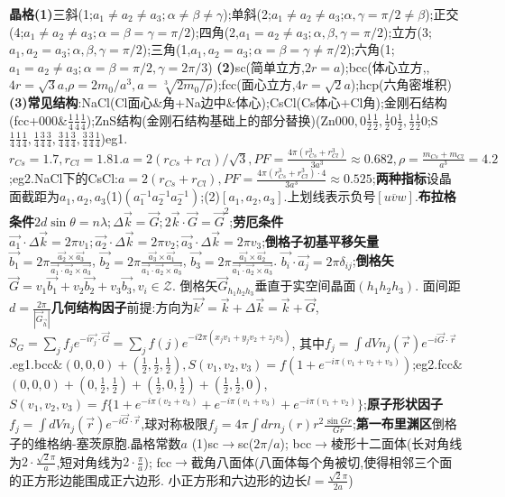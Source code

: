 \documentclass[UTF8,a4paper,10pt,twocolumn]{ctexart}
\begin{document}
\textbf{晶格}\textbf{(1)}三斜(1;$a_1\neq a_2\neq a_3;\alpha\neq\beta\neq\gamma$);单斜(2;$a_1\neq a_2\neq a_3$;$\alpha,\gamma=\pi/2\neq\beta$);正交(4;$a_1\neq a_2\neq a_3;\alpha=\beta=\gamma=\pi/2$);四角(2,$a_1=a_2\neq a_3;\alpha,\beta,\gamma=\pi/2$);立方(3;$a_1,a_2=a_3;\alpha,\beta,\gamma=\pi/2$);三角(1,$a_1,a_2=a_3;\alpha=\beta=\gamma\neq\pi/2$);六角(1;$a_1=a_2\neq a_3;\alpha=\beta=\pi/2,\gamma=2\pi/3$)
  \textbf{(2)}sc(简单立方,$2r=a$);bcc(体心立方,,$4r=\sqrt{3}a$,$\rho=2m_0/a^3,a=\sqrt[3]{2m_0/\rho}$);fcc(面心立方,$4r=\sqrt{2}a$);hcp(六角密堆积)
  \textbf{(3)常见结构}:NaCl(Cl面心\&角+Na边中\&体心);CsCl(Cs体心+Cl角);金刚石结构(fcc+$000\&\frac{1}{4}\frac{1}{4}\frac{1}{4}$);ZnS结构(金刚石结构基础上的部分替换)(Zn$000,0\frac{1}{2}\frac{1}{2},\frac{1}{2}0\frac{1}{2},\frac{1}{2}\frac{1}{2}0$;S$\frac{1}{4}\frac{1}{4}\frac{1}{4},\frac{1}{4}\frac{3}{4}\frac{3}{4},\frac{3}{4}\frac{1}{4}\frac{3}{4},\frac{3}{4}\frac{3}{4}\frac{1}{4}$)eg1.$r_{Cs}=1.7,r_{Cl}=1.81.a=2(r_{Cs}+r_{Cl})/\sqrt{3},PF=\frac{4\pi(r_{Cs}^3+r_{Cl}^3)}{3a^3}\approx 0.682,\rho=\frac{m_{Cs}+m_{Cl}}{a^3}=4.2$;eg2.NaCl下的CsCl:$a=2(r_{Cs}+r_{Cl}),PF=\frac{4\pi(r_{Cs}^3+r_{Cl}^3)\cdot 4}{3a^3}\approx 0.525$;\textbf{两种指标}设晶面截距为$a_1,a_2,a_3$(1)$(a_1^{-1}a_{2}^{-1}a_2^{-1})$;(2)$[a_1,a_2,a_3]$.上划线表示负号$[u\overline{v}w]$.\textbf{布拉格条件}$2d\sin{\theta}=n\lambda;\Delta\vec{k}=\vec{G};2\vec{k}\cdot\vec{G}=\vec{G}^2$;\textbf{劳厄条件}$\vec{a_1}\cdot\Delta\vec{k}=2\pi v_1;\vec{a_2}\cdot\Delta\vec{k}=2\pi v_2;\vec{a_3}\cdot\Delta\vec{k}=2\pi v_3$;\textbf{倒格子初基平移矢量}
  $\vec{b_1}=2\pi\frac{\vec{a_2}\times\vec{a_3}}{\vec{a_1}\cdot\vec{a_2}\times\vec{a_3}}$,
  $\vec{b_2}=2\pi\frac{\vec{a_3}\times\vec{a_1}}{\vec{a_1}\cdot\vec{a_2}\times\vec{a_3}}$,
  $\vec{b_3}=2\pi\frac{\vec{a_1}\times\vec{a_2}}{\vec{a_1}\cdot\vec{a_2}\times\vec{a_3}}$.
  $\vec{b_i}\cdot\vec{a_j}=2\pi\delta_{ij}$;\textbf{倒格矢}
  $\vec{G}=v_1\vec{b_1}+v_2\vec{b_2}+v_3\vec{b_3},v_{i}\in\mathcal{Z}$.
  倒格矢$\vec{G}_{h_1h_2h_3}$垂直于实空间晶面$(h_1h_2h_3)$.
  面间距$d=\frac{2\pi }{|\vec{G}_{\vec{h}}|}$\textbf{几何结构因子}前提:方向为$\vec{k'}=\vec{k}+\Delta\vec{k}=\vec{k}+\vec{G}$,
  $S_{G}=\sum_{j} f_{j}e^{-i\vec{r_{j}}\cdot\vec{G}}=\sum_{j}f(j)e^{-i2\pi(x_j v_1+y_j v_2+z_j v_3)}$,
  其中$f_{j}=\int dVn_{j}(\vec{r})e^{-i\vec{G}\cdot\vec{r}}$.eg1.bcc$\&$$(0,0,0)+(\frac{1}{2},\frac{1}{2},\frac{1}{2}),S(v_1,v_2,v_3)=f(1+e^{-i\pi(v_1+v_2+v_3)})$;eg2.fcc$\&$$(0,0,0)+(0,\frac{1}{2},\frac{1}{2})+(\frac{1}{2},0,\frac{1}{2})+(\frac{1}{2},\frac{1}{2},0)$,$S(v_1,v_2,v_3)=f\{1+e^{-i\pi(v_2+v_3)}+e^{-i\pi(v_1+v_3)}+e^{-i\pi(v_1+v_2)}\}$;\textbf{原子形状因子}$f_j=\int dVn_j(\vec{r})e^{-i\vec{G}\cdot\vec{r}}$,球对称极限$f_j=4\pi\int drn_j(r)r^2\frac{\sin{Gr}}{Gr}$;\textbf{第一布里渊区}倒格子的维格纳-塞茨原胞.晶格常数$a$
  (1)sc$\rightarrow$sc($2\pi/a$);
  bcc$\rightarrow$棱形十二面体(长对角线为$2\cdot\frac{\sqrt{2}\pi}{a}$,短对角线为$2\cdot\frac{\pi}{a}$);
  fcc$\rightarrow$截角八面体(八面体每个角被切,使得相邻三个面的正方形边能围成正六边形.
  小正方形和六边形的边长$l=\frac{\sqrt{2}\pi}{2a}$)
\end{document}
